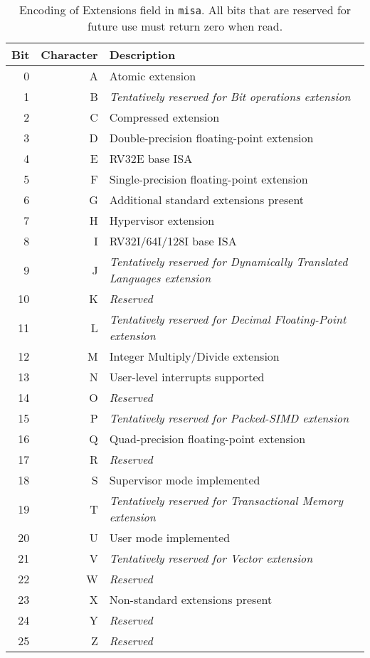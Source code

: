 \begin{table*}
\begin{center}
\begin{tabular}{|r|r|l|}
\hline
Bit & Character  & Description \\
\hline	 
  0 & A & Atomic extension \\
  1 & B & {\em Tentatively reserved for Bit operations extension} \\
  2 & C & Compressed extension \\
  3 & D & Double-precision floating-point extension \\
  4 & E & RV32E base ISA \\
  5 & F & Single-precision floating-point extension \\
  6 & G & Additional standard extensions present \\
  7 & H & Hypervisor extension \\
  8 & I & RV32I/64I/128I base ISA \\
  9 & J & {\em Tentatively reserved for Dynamically Translated Languages extension} \\
 10 & K & {\em Reserved} \\
 11 & L & {\em Tentatively reserved for Decimal Floating-Point extension} \\
 12 & M & Integer Multiply/Divide extension \\
 13 & N & User-level interrupts supported \\
 14 & O & {\em Reserved} \\
 15 & P & {\em Tentatively reserved for Packed-SIMD extension} \\
 16 & Q & Quad-precision floating-point extension \\
 17 & R & {\em Reserved} \\
 18 & S & Supervisor mode implemented \\
 19 & T & {\em Tentatively reserved for Transactional Memory extension} \\
 20 & U & User mode implemented \\
 21 & V & {\em Tentatively reserved for Vector extension} \\
 22 & W & {\em Reserved} \\
 23 & X & Non-standard extensions present \\
 24 & Y & {\em Reserved} \\
 25 & Z & {\em Reserved} \\
\hline
\end{tabular}
\end{center}
\caption{Encoding of Extensions field in {\tt misa}.  All bits that are
  reserved for future use must return zero when read.}
\label{misaletters}
\end{table*}


